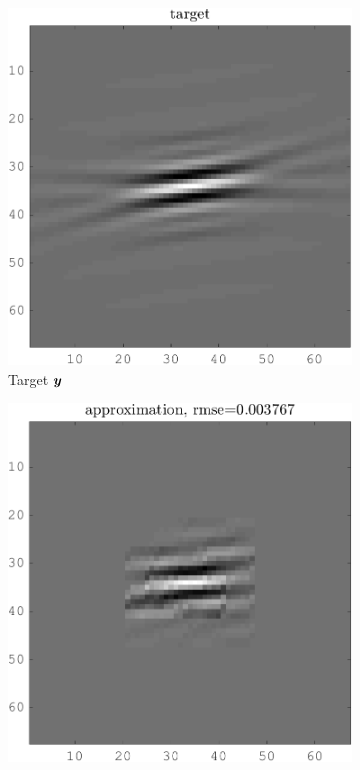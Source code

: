 \begin{figure}[!ht]\centering
	\begin{subfigure}[b]{0.22\textwidth}\centering
	\includegraphics[width=\textwidth]{figures/xp/tilted_n4/xp_128x128_sc2_angl4_K3_S3_node4_target.png}
	\caption{Target $\bm{y}$}
	\end{subfigure}
	\begin{subfigure}[b]{0.22\textwidth}\centering
	\includegraphics[width=\textwidth]{figures/xp/tilted_n4/xp_128x128_sc2_angl4_K3_S3_node4_approx.png}

\end{subfigure}
\end{figure}
